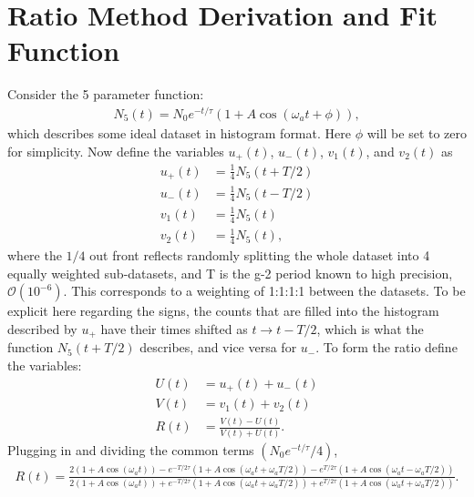 \chapter{Ratio Method Derivation and Fit Function}
\label{Appendix}

Consider the 5 parameter function:
	\begin{align}
		N_{5}(t) = N_{0}e^{-t/\tau}(1 + A \cos(\omega_{a}t + \phi)),
	\end{align}
which describes some ideal dataset in histogram format. Here $\phi$ will be set to zero for simplicity. Now define the variables $u_{+}(t)$, $u_{-}(t)$, $v_{1}(t)$, and $v_{2}(t)$ as
	\begin{equation}
	\begin{aligned}
		u_{+}(t) &= \frac{1}{4} N_{5}(t+T/2) \\
		u_{-}(t) &= \frac{1}{4} N_{5}(t-T/2) \\
		v_{1}(t) &= \frac{1}{4} N_{5}(t) \\
		v_{2}(t) &= \frac{1}{4} N_{5}(t),
	\end{aligned}
	\end{equation}
where the $1/4$ out front reflects randomly splitting the whole dataset into 4 equally weighted sub-datasets, and T is the g-2 period known to high precision, $\mathcal{O}(10^{-6})$. This corresponds to a weighting of 1:1:1:1 between the datasets. To be explicit here regarding the signs, the counts that are filled into the histogram described by $u_{+}$ have their times shifted as $t \rightarrow t - T/2$, which is what the function $N_{5}(t+T/2)$ describes, and vice versa for $u_{-}$. To form the ratio define the variables:
	\begin{equation}
	\begin{aligned}
		U(t) &= u_{+}(t) + u_{-}(t) \\
		V(t) &= v_{1}(t) + v_{2}(t) \\
		R(t) &= \frac{V(t) - U(t)}{V(t) + U(t)}.
	\end{aligned}
	\end{equation}
Plugging in and dividing the common terms $(N_{0}e^{-t/\tau}/4)$,
	\begin{align}
		R(t) = \frac{2(1 + A \cos(\omega_{a}t)) - e^{-T/ 2\tau} (1 + A \cos(\omega_{a}t + \omega_{a}T/2)) - e^{T/ 2\tau} (1 + A \cos(\omega_{a}t - \omega_{a}T/2))} {2(1 + A \cos(\omega_{a}t)) + e^{-T/ 2\tau} (1 + A \cos(\omega_{a}t + \omega_{a}T/2)) + e^{T/ 2\tau} (1 + A \cos(\omega_{a}t + \omega_{a}T/2))}.
	\end{align}

